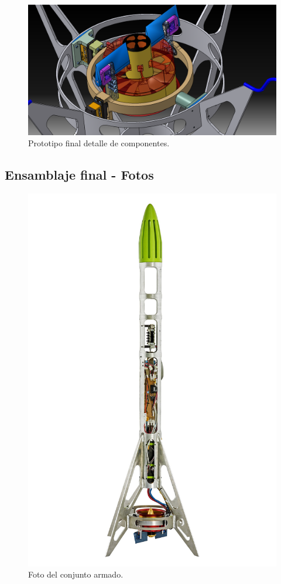 \begin{figure}[htb]
    \centering
    \includegraphics[height=0.25\pdfpageheight]{fig/design/v6_6}
    \caption{Prototipo final detalle de componentes.}
    \label{fig:design/v6_6}
\end{figure}

\null\newpage
\clearpage

\subsection{Ensamblaje final - Fotos}
\begin{figure}[htb]
    \centering
    \includegraphics[height=0.6\pdfpageheight]{fig/hq/wide_plane_bonete.jpg}
    \caption{Foto del conjunto armado.}
    \label{fig:hq/wide_plane_bonete}
\end{figure}

